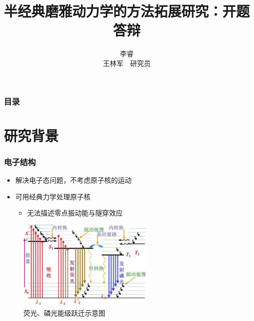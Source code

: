 \documentclass{beamer}
\title{\bfseries 半经典磨雅动力学的方法拓展研究：开题答辩}
\author{李睿 \\ 王林军~~研究员}
\begin{document}
\begin{frame}[t]\frametitle{}
    
\maketitle

\end{frame}

\begin{frame}[t]\frametitle{目录}
\tableofcontents
\end{frame}

\section{研究背景}
\begin{frame}[t]\frametitle{电子结构}
   
\begin{itemize}
 \item 解决电子态问题，不考虑原子核的运动
 \item 可用经典力学处理原子核
 \begin{itemize}
 	\item 无法描述零点振动能与隧穿效应
 \end{itemize}
\end{itemize}

\begin{figure}
\includegraphics[width=0.6\textwidth]{fluoresence.jpg}
\caption*{荧光、磷光能级跃迁示意图}
\end{figure}
\end{frame}
\end{document}
